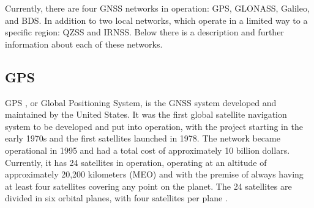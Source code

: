 Currently, there are four GNSS networks in operation: GPS, GLONASS, Galileo, and BDS. In addition to two local networks, which operate in a limited way to a specific region: QZSS and IRNSS. Below there is a description and further information about each of these networks.

\subsection{GPS}


GPS \cite{gps}, or Global Positioning System, is the GNSS system developed and maintained by the United States. It was the first global satellite navigation system to be developed and put into operation, with the project starting in the early 1970s and the first satellites launched in 1978. The network became operational in 1995 and had a total cost of approximately 10 billion dollars. Currently, it has 24 satellites in operation, operating at an altitude of approximately 20,200 kilometers (MEO) and with the premise of always having at least four satellites covering any point on the planet. The 24 satellites are divided in six orbital planes, with four satellites per plane \cite{el-rabbany2002}.


